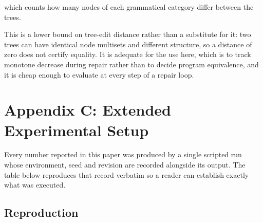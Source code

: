 \documentclass{article}
\begin{document}
which counts how many nodes of each grammatical category differ between the trees.

This is a lower bound on tree-edit distance rather than a substitute for it: two trees can have identical node multisets and different structure, so a distance of zero does not certify equality. It is adequate for the use here, which is to track monotone decrease during repair rather than to decide program equivalence, and it is cheap enough to evaluate at every step of a repair loop.




\section{Appendix C: Extended Experimental Setup}


Every number reported in this paper was produced by a single scripted run whose environment, seed and revision are recorded alongside its output. The table below reproduces that record verbatim so a reader can establish exactly what was executed.
\begin{table}[htbp]
\centering
{}
\end{table}


\subsection{Reproduction}
\end{document}
